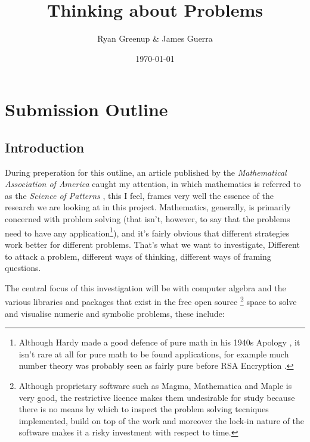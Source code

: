\documentclass[11pt]{article}
\author{Ryan Greenup \& James Guerra}
\date{\today}
\title{Thinking about Problems}
\begin{document}
\maketitle
\tableofcontents


\section{Submission Outline}
\label{sec:org80f7682}
\subsection{Introduction}
\label{sec:org17b6389}

During preperation for this outline, an article published by the \emph{Mathematical
Association of America} caught my attention, in which mathematics is referred to
as the \emph{Science of Patterns} \cite{friedMathematicsSciencePatterns2010}, this I
feel, frames very well the essence of the research we are looking at in this
project. Mathematics, generally, is primarily concerned with problem solving
(that isn't, however, to say that the problems need to have any
application\footnote{Although Hardy made a good defence of pure math in his 1940s Apology \cite{hardyMathematicianApology2012}, it isn't rare at all for pure math to be found applications, for example much number theory was probably seen as fairly pure before RSA Encryption \cite{spraulHowSoftwareWorks2015}.}), and it's fairly obvious that different strategies work
better for different problems. That's what we want to investigate, Different to
attack a problem, different ways of thinking, different ways of framing
questions.

The central focus of this investigation will be with computer algebra and the
various libraries and packages that exist in the free open source \footnote{Although proprietary software such as Magma, Mathematica and Maple is very good, the restrictive licence makes them undesirable for study because there is no means by which to inspect the problem solving tecniques implemented, build on top of the work and moreover the lock-in nature of the software makes it a risky investment with respect to time.} space to solve
and visualise numeric and symbolic problems, these include:
\end{document}
